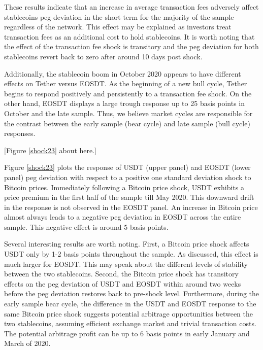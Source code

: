 \documentclass[12pt]{article}
\begin{document}
These results indicate that an increase in average transaction fees adversely affect stablecoins peg deviation in the short term for the majority of the sample regardless of the network. This effect may be explained as investors treat transaction fees as an additional cost to hold stablecoins. It is worth noting that the effect of the transaction fee shock is transitory and the peg deviation for both stablecoins revert back to zero after around 10 days post shock. 

Additionally, the stablecoin boom in October 2020 appears to have different effects on Tether versus EOSDT. As the beginning of a new bull cycle, Tether begins to respond positively and persistently to a transaction fee shock. On the other hand, EOSDT displays a large trough response up to 25 basis points in October and the late sample. Thus, we believe market cycles are responsible for the contrast between the early sample (bear cycle) and late sample (bull cycle) responses. 


\begin{center}
	[Figure \ref{shock23} about here.]
\end{center}


Figure \ref{shock23} plots the response of USDT (upper panel) and EOSDT (lower panel) peg deviation with respect to a positive one standard deviation shock to Bitcoin prices. Immediately following a Bitcoin price shock, USDT exhibits a price premium in the first half of the sample till May 2020. This downward drift in the response is not observed in the EOSDT panel. An increase in Bitcoin price almost always leads to a negative peg deviation in EOSDT across the entire sample. This negative effect is around 5 basis points. 

Several interesting results are worth noting. First, a Bitcoin price shock affects USDT only by 1-2 basis points throughout the sample. As discussed, this effect is much larger for EOSDT. This may speak about the different levels of stability between the two stablecoins. Second, the Bitcoin price shock has transitory effects on the peg deviation of USDT and EOSDT within around two weeks before the peg deviation restores back to pre-shock level. Furthermore, during the early sample bear cycle, the difference in the USDT and EOSDT response to the same Bitcoin price shock suggests potential arbitrage opportunities between the two stablecoins, assuming efficient exchange market and trivial transaction costs. The potential arbitrage profit can be up to 6 basis points in early January and March of 2020.
\end{document}
